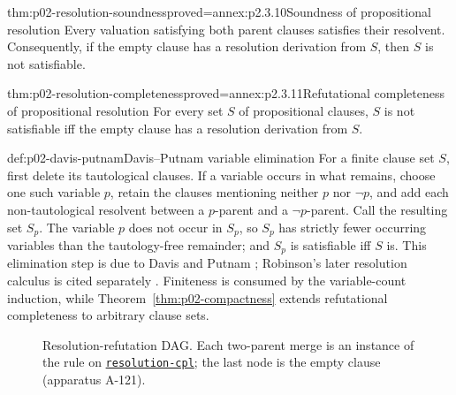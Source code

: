 \begin{hbtheorem}{thm:p02-resolution-soundness}{proved=annex:p2.3.10}{Soundness of propositional resolution}
Every valuation satisfying both parent clauses satisfies their resolvent.
Consequently, if the empty clause has a resolution derivation from \(S\),
then \(S\) is not satisfiable.
\end{hbtheorem}

\begin{hbtheorem}{thm:p02-resolution-completeness}{proved=annex:p2.3.11}{Refutational completeness of propositional resolution}
For every set \(S\) of propositional clauses, \(S\) is not satisfiable iff
the empty clause has a resolution derivation from \(S\).
\end{hbtheorem}

\begin{hbmethod}{def:p02-davis-putnam}{Davis--Putnam variable elimination}
For a finite clause set \(S\), first delete its tautological clauses.  If a
variable occurs in what remains, choose one such variable \(p\), retain the
clauses mentioning neither \(p\) nor \(\neg p\), and add each non-tautological
resolvent between a \(p\)-parent and a \(\neg p\)-parent.  Call the resulting
set \(S_p\).  The variable \(p\) does not occur in \(S_p\), so \(S_p\) has
strictly fewer
occurring variables than the tautology-free remainder; and \(S_p\) is
satisfiable iff \(S\) is.  This
elimination step is due to Davis and Putnam \cite{DavisPutnam1960}; Robinson's
later resolution calculus is cited separately \cite{Robinson1965}.  Finiteness
is consumed by the variable-count induction, while
Theorem~\ref{thm:p02-compactness} extends refutational completeness to
arbitrary clause sets.
\end{hbmethod}

\begin{figure}[tp]
\centering
{}
\caption{Resolution-refutation DAG.  Each two-parent merge is an instance of
the rule on \hyperref[sheet:resolution-cpl]{\texttt{resolution-cpl}}; the last node is the empty clause
(apparatus A-121).}
\label{fig:p02-resolution-dag}
\end{figure}

